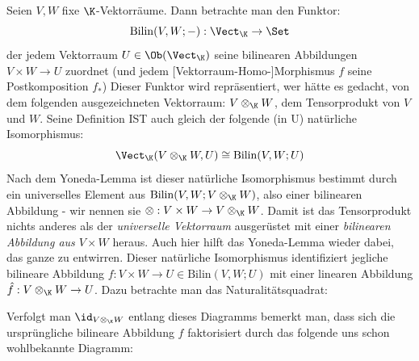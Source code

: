 \documentclass[11pt]{article}
\begin{document}
\begin{example}
Seien $V,W$ fixe $\K$-Vektorräume. Dann betrachte man den Funktor:
$$\mathrm{Bilin}(V,W; -): \Vect_\K \to \Set$$
der jedem Vektorraum $U\in \Ob(\Vect_\K )$ seine bilinearen Abbildungen $V\times W\to U$ zuordnet (und jedem [Vektorraum-Homo-]Morphismus $f$ seine Postkomposition $f_*$) Dieser Funktor wird repräsentiert, wer hätte es gedacht, von dem folgenden ausgezeichneten Vektorraum: $V\otimes_\K W$, dem Tensorprodukt von $V$ und $W$. Seine Definition IST auch gleich der folgende (in U) natürliche Isomorphismus:
$$\Vect_\K( V\otimes_\K W, U) \cong \mathrm{Bilin}(V,W;U)$$
Nach dem Yoneda-Lemma ist dieser natürliche Isomorphismus bestimmt durch ein universelles Element aus $\mathrm{Bilin}(V,W;V\otimes_\K W)$, also einer bilinearen Abbildung - wir nennen sie $\otimes: V\times W \to V\otimes_\K W$. Damit ist das Tensorprodukt nichts anderes als der \emph{universelle Vektorraum} ausgerüstet mit einer \emph{bilinearen Abbildung aus $V\times W$} heraus. Auch hier hilft das Yoneda-Lemma wieder dabei, das ganze zu entwirren. Dieser natürliche Isomorphismus identifiziert jegliche bilineare Abbildung $f: V\times W\to U \in \mathrm{Bilin}(V,W;U)$ mit einer linearen Abbildung $\hat{f}: V\otimes_\K W \to U$. Dazu betrachte man das Naturalitätsquadrat:

\begin{figure}[h]
    \centering
{}
\end{figure}

Verfolgt man $\id_{V\otimes_\K W}$ entlang dieses Diagramms bemerkt man, dass sich die ursprüngliche bilineare Abbildung $f$ faktorisiert durch das folgende uns schon wohlbekannte Diagramm:

\begin{figure}[h]
    \centering
{}
\end{figure}
\end{example}
\end{document}
